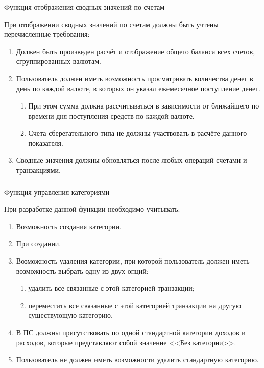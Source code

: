 \subsubsection{} Функция отображения сводных значений по счетам
\label{sec:domain:specification:wallets_stats}

При отображении сводных значений по счетам должны быть учтены перечисленные требования:

\begin{enumerate}
    \item Должен быть произведен расчёт и отображение общего баланса всех счетов, сгруппированных валютам.
    \item Пользователь должен иметь возможность просматривать количества денег в день по каждой валюте, в которых он указал ежемесячное поступление денег.
    \begin{enumerate}
        \item При этом сумма должна рассчитываться в зависимости от ближайшего по времени дня поступления средств по каждой валюте.
        \item Счета сберегательного типа не должны участвовать в расчёте данного показателя.
    \end{enumerate}
    \item Сводные значения должны обновляться после любых операций счетами и транзакциями.
\end{enumerate}

\subsubsection{} Функция управления категориями
\label{sec:domain:specification:categories}

При разработке данной функции необходимо учитывать:

\begin{enumerate}
    \item Возможность создания категории.
    \item При создании.
    \item Возможность удаления категории, при которой пользователь должен иметь возможность выбрать одну из двух опций:
    \begin{enumerate}
        \item удалить все связанные с этой категорией транзакции;
        \item переместить все связанные с этой категорией транзакции на другую существующую категорию.
    \end{enumerate}
    \item В ПС должны присутствовать по одной стандартной категории доходов и расходов, которые представляют собой значение <<Без категории>>.
    \item Пользователь не должен иметь возможности удалить стандартную категорию.
\end{enumerate}


